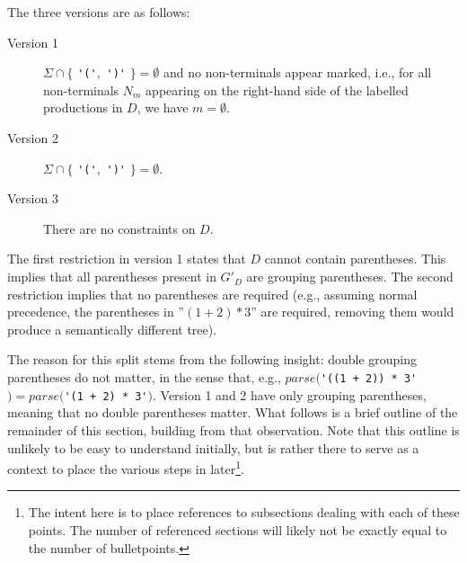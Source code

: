 \documentclass[acmsmall,review,anonymous]{acmart}\settopmatter{printfolios=true,printccs=false,printacmref=false}
\newcommand{\T}{\Sigma} %
\newcommand{\parse}{\mathit{parse}} %
\begin{document}
The three versions are as follows:

\begin{description}
\item[Version 1] $\T \cap \{$ \verb|'('|$,$ \verb|')'| $\} = \emptyset$ and no non-terminals appear marked, i.e., for all non-terminals $N_m$ appearing on the right-hand side of the labelled productions in $D$, we have $m = \emptyset$.
\item[Version 2] $\T \cap \{$ \verb|'('|$,$ \verb|')'| $\} = \emptyset$.
\item[Version 3] There are no constraints on $D$.
\end{description}

\noindent The first restriction in version 1 states that $D$ cannot contain parentheses. This implies that all parentheses present in $G'_D$ are grouping parentheses. The second restriction implies that no parentheses are required (e.g., assuming normal precedence, the parentheses in ''$(1 + 2) * 3$'' are required, removing them would produce a semantically different tree).

The reason for this split stems from the following insight: double grouping parentheses do not matter, in the sense that, e.g., $\parse($\verb|'((1 + 2)) * 3'|$) = \parse($\verb|'(1 + 2) * 3'|$)$. Version 1 and 2 have only grouping parentheses, meaning that no double parentheses matter. What follows is a brief outline of the remainder of this section, building from that observation. Note that this outline is unlikely to be easy to understand initially, but is rather there to serve as a context to place the various steps in later\footnote{The intent here is to place references to subsections dealing with each of these points. The number of referenced sections will likely not be exactly equal to the number of bulletpoints.}.
\end{document}
